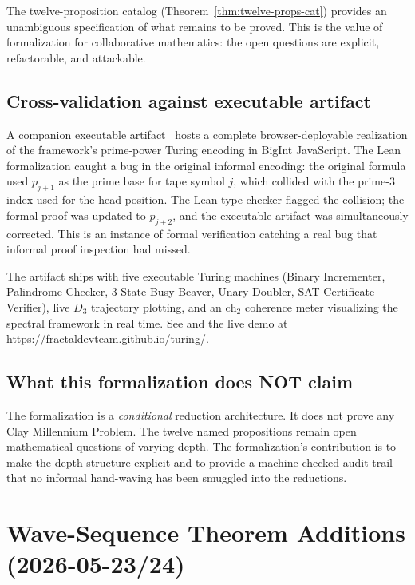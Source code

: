\documentclass[11pt,a4paper]{article}
\theoremstyle{definition}
\begin{document}
The twelve-proposition catalog (Theorem~\ref{thm:twelve-props-cat})
provides an unambiguous specification of what remains to be proved.
This is the value of formalization for collaborative mathematics:
the open questions are explicit, refactorable, and attackable.

\subsection{Cross-validation against executable artifact}

A companion executable artifact~\cite{cohen2026turing} hosts a complete
browser-deployable realization of the framework's prime-power Turing
encoding in BigInt JavaScript. The Lean formalization caught a bug in
the original informal encoding: the original formula used
$p_{j+1}$ as the prime base for tape symbol $j$, which collided with
the prime-$3$ index used for the head position. The Lean type checker
flagged the collision; the formal proof was updated to $p_{j+2}$, and
the executable artifact was simultaneously corrected. This is an
instance of formal verification catching a real bug that informal
proof inspection had missed.

The artifact ships with five executable Turing machines (Binary
Incrementer, Palindrome Checker, 3-State Busy Beaver, Unary Doubler,
SAT Certificate Verifier), live $D_3$ trajectory plotting, and an
$\mathrm{ch}_2$ coherence meter visualizing the spectral framework
in real time. See \cite{cohen2026turing} and the live demo at
\url{https://fractaldevteam.github.io/turing/}.

\subsection{What this formalization does NOT claim}

The formalization is a \emph{conditional} reduction architecture. It
does not prove any Clay Millennium Problem. The twelve named
propositions remain open mathematical questions of varying depth. The
formalization's contribution is to make the depth structure explicit
and to provide a machine-checked audit trail that no informal
hand-waving has been smuggled into the reductions.

\section{Wave-Sequence Theorem Additions (2026-05-23/24)}
\label{sec:wave-9-additions}
\end{document}
